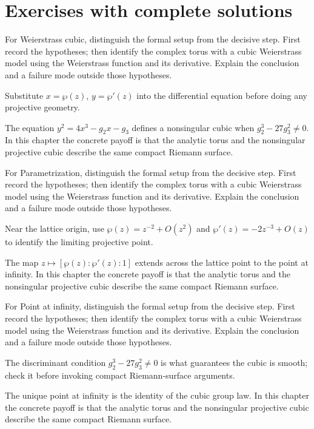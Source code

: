 \section{Exercises with complete solutions}

\begin{exercise}\label{exr:iv31-01}
For Weierstrass cubic, distinguish the formal setup from the decisive step. First record the hypotheses; then identify the complex torus with a cubic Weierstrass model using the Weierstrass function and its derivative. Explain the conclusion and a failure mode outside those hypotheses.
\end{exercise}
\begin{hint}
Substitute \(x=\wp(z)\), \(y=\wp'(z)\) into the differential equation before doing any projective geometry.
\end{hint}
\begin{solution}
The equation $y^2=4x^3-g_2x-g_3$ defines a nonsingular cubic when $g_2^3-27g_3^2\ne0$. In this chapter the concrete payoff is that the analytic torus and the nonsingular projective cubic describe the same compact Riemann surface.
\end{solution}

\begin{exercise}\label{exr:iv31-02}
For Parametrization, distinguish the formal setup from the decisive step. First record the hypotheses; then identify the complex torus with a cubic Weierstrass model using the Weierstrass function and its derivative. Explain the conclusion and a failure mode outside those hypotheses.
\end{exercise}
\begin{hint}
Near the lattice origin, use \(\wp(z)=z^{-2}+O(z^2)\) and \(\wp'(z)=-2z^{-3}+O(z)\) to identify the limiting projective point.
\end{hint}
\begin{solution}
The map $z\mapsto[\wp(z):\wp'(z):1]$ extends across the lattice point to the point at infinity. In this chapter the concrete payoff is that the analytic torus and the nonsingular projective cubic describe the same compact Riemann surface.
\end{solution}

\begin{exercise}\label{exr:iv31-03}
For Point at infinity, distinguish the formal setup from the decisive step. First record the hypotheses; then identify the complex torus with a cubic Weierstrass model using the Weierstrass function and its derivative. Explain the conclusion and a failure mode outside those hypotheses.
\end{exercise}
\begin{hint}
The discriminant condition \(g_2^3-27g_3^2\ne0\) is what guarantees the cubic is smooth; check it before invoking compact Riemann-surface arguments.
\end{hint}
\begin{solution}
The unique point at infinity is the identity of the cubic group law. In this chapter the concrete payoff is that the analytic torus and the nonsingular projective cubic describe the same compact Riemann surface.
\end{solution}

